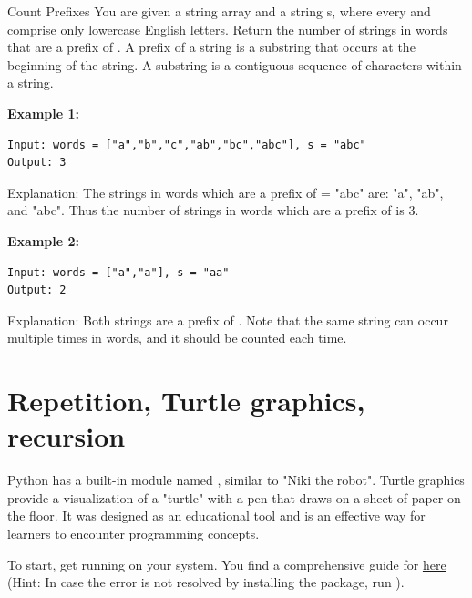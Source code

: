 \documentclass[twoside]{article}
\begin{document}
\begin{task}{Count Prefixes}{}{}
You are given a string array  and a string s, where every  and  comprise only lowercase English letters.
Return the number of strings in words that are a prefix of .
A prefix of a string is a substring that occurs at the beginning of the string. 
A substring is a contiguous sequence of characters within a string.

 \vspace{10pt}

\textbf{Example 1:}

\begin{lstlisting}[numbers=none]
Input: words = ["a","b","c","ab","bc","abc"], s = "abc"
Output: 3
\end{lstlisting}
Explanation: The strings in words which are a prefix of  = "abc" are:
"a", "ab", and "abc".
Thus the number of strings in words which are a prefix of  is 3.
\vspace{10pt}

\textbf{Example 2:}
\begin{lstlisting}[numbers=none]
Input: words = ["a","a"], s = "aa"
Output: 2
\end{lstlisting}
Explanation: Both strings are a prefix of . 
Note that the same string can occur multiple times in words, and it should be counted each time.

\end{task}


\clearpage
\section{Repetition, Turtle graphics, recursion}

\vspace{10pt}

Python has a built-in module named , similar to "Niki the robot".
Turtle graphics provide a visualization of a "turtle" with a pen that draws on a sheet of paper on the floor.
It was designed as an educational tool and is an effective way for learners to encounter programming concepts.

\vspace{10pt}

To start, get  running on your system. You find a comprehensive guide for  \href{https://docs.python.org/3/library/turtle.html}{here}
(Hint: In case the  error is not resolved by installing the  package, run ).
\end{document}
